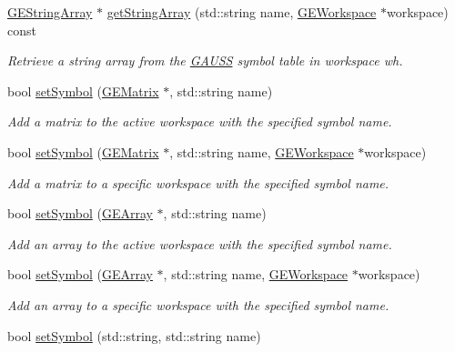 \begin{DoxyCompactItemize}
\hyperlink{class_g_e_string_array}{G\-E\-String\-Array} $\ast$ \hyperlink{class_g_a_u_s_s_a875ee75139688fce93019355a17e1310}{get\-String\-Array} (std\-::string name, \hyperlink{class_g_e_workspace}{G\-E\-Workspace} $\ast$workspace) const 
\begin{DoxyCompactList}\small\item\em Retrieve a string array from the \hyperlink{class_g_a_u_s_s}{G\-A\-U\-S\-S} symbol table in workspace {\itshape wh}. \end{DoxyCompactList}\item 
bool \hyperlink{class_g_a_u_s_s_ab51cbcd5a66ba3355f52bf10bf31f7e3}{set\-Symbol} (\hyperlink{class_g_e_matrix}{G\-E\-Matrix} $\ast$, std\-::string name)
\begin{DoxyCompactList}\small\item\em Add a matrix to the active workspace with the specified symbol name. \end{DoxyCompactList}\item 
bool \hyperlink{class_g_a_u_s_s_a23181c31041882ce839f816ce56e1231}{set\-Symbol} (\hyperlink{class_g_e_matrix}{G\-E\-Matrix} $\ast$, std\-::string name, \hyperlink{class_g_e_workspace}{G\-E\-Workspace} $\ast$workspace)
\begin{DoxyCompactList}\small\item\em Add a matrix to a specific workspace with the specified symbol name. \end{DoxyCompactList}\item 
bool \hyperlink{class_g_a_u_s_s_a328c6fadd097c46b0651d1985c12759d}{set\-Symbol} (\hyperlink{class_g_e_array}{G\-E\-Array} $\ast$, std\-::string name)
\begin{DoxyCompactList}\small\item\em Add an array to the active workspace with the specified symbol name. \end{DoxyCompactList}\item 
bool \hyperlink{class_g_a_u_s_s_a0b47905610cb724bd9d6b69ef57ddc60}{set\-Symbol} (\hyperlink{class_g_e_array}{G\-E\-Array} $\ast$, std\-::string name, \hyperlink{class_g_e_workspace}{G\-E\-Workspace} $\ast$workspace)
\begin{DoxyCompactList}\small\item\em Add an array to a specific workspace with the specified symbol name. \end{DoxyCompactList}\item 
bool \hyperlink{class_g_a_u_s_s_aa37c658d30c98dd8e38a8ce682083a10}{set\-Symbol} (std\-::string, std\-::string name)

\end{DoxyCompactItemize}

